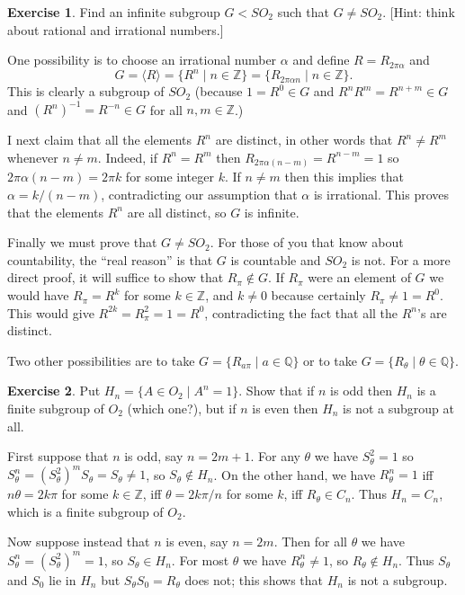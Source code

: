 \documentclass{amsart}
\renewcommand{\:}{\colon}
\newcommand{\ip}[1]{\langle #1\rangle}
\newcommand{\st}{\;|\;}
\newcommand{\Z}{\mathbb{Z}}
\newcommand{\Q}{\mathbb{Q}}
\newcommand{\al}        {\alpha}
\newcommand{\tht}       {\theta}
\theoremstyle{definition}
\newtheorem{exercise}{Exercise}
\newenvironment{solution}{{\noindent\bf Solution:}}{}
\begin{document}
\begin{exercise}
 Find an infinite subgroup $G<SO_2$ such that $G\neq SO_2$.  [Hint:
 think about rational and irrational numbers.]
\end{exercise}
\begin{solution}
 One possibility is to choose an irrational number $\al$ and define
 $R=R_{2\pi\al}$ and 
 \[ G = \ip{R} = \{R^n\st n\in\Z\} = \{R_{2\pi\al n}\st n\in\Z\}. \]
 This is clearly a subgroup of $SO_2$ (because $1=R^0\in G$ and
 $R^nR^m=R^{n+m}\in G$ and $(R^n)^{-1}=R^{-n}\in G$ for all
 $n,m\in\Z$.)  

 I next claim that all the elements $R^n$ are distinct, in other words
 that $R^n\neq R^m$ whenever $n\neq m$.  Indeed, if $R^n=R^m$ then
 $R_{2\pi\al(n-m)}=R^{n-m}=1$ so $2\pi\al(n-m)=2\pi k$ for some
 integer $k$.  If $n\neq m$ then this implies that $\al=k/(n-m)$,
 contradicting our assumption that $\al$ is irrational.  This proves
 that the elements $R^n$ are all distinct, so $G$ is infinite.  

 Finally we must prove that $G\neq SO_2$.  For those of you that know
 about countability, the ``real reason'' is that $G$ is countable and
 $SO_2$ is not.  For a more direct proof, it will suffice to show that
 $R_\pi\not\in G$.  If $R_\pi$ were an element of $G$ we would have
 $R_\pi=R^k$ for some $k\in\Z$, and $k\neq 0$ because certainly
 $R_\pi\neq 1=R^0$.  This would give $R^{2k}=R_\pi^2=1=R^0$,
 contradicting the fact that all the $R^n$'s are distinct.

 Two other possibilities are to take $G=\{R_{a\pi}\st a\in\Q\}$ or to
 take $G=\{R_\tht\st\tht\in\Q\}$.
\end{solution}

\begin{exercise}
 Put $H_n=\{A\in O_2\st A^n=1\}$.  Show that if $n$ is odd then $H_n$ is
 a finite subgroup of $O_2$ (which one?), but if $n$ is even then
 $H_n$ is not a subgroup at all.
\end{exercise}
\begin{solution}
 First suppose that $n$ is odd, say $n=2m+1$.  For any $\tht$ we have
 $S_\tht^2=1$ so $S_\tht^n=(S_\tht^2)^mS_\tht=S_\tht\neq 1$, so
 $S_\tht\not\in H_n$.  On the other hand, we have $R_\tht^n=1$ iff
 $n\tht=2k\pi$ for some $k\in\Z$, iff $\tht=2k\pi/n$ for some $k$, iff
 $R_\tht\in C_n$.  Thus $H_n=C_n$, which is a finite subgroup of
 $O_2$.

 Now suppose instead that $n$ is even, say $n=2m$.  Then for all
 $\tht$ we have $S_\tht^n=(S_\tht^2)^m=1$, so $S_\tht\in H_n$.  For
 most $\tht$ we have $R_\tht^n\neq 1$, so $R_\tht\not\in H_n$.  Thus
 $S_\tht$ and $S_0$ lie in $H_n$ but $S_\tht S_0=R_\tht$ does not;
 this shows that $H_n$ is not a subgroup.
\end{solution}
\end{document}
